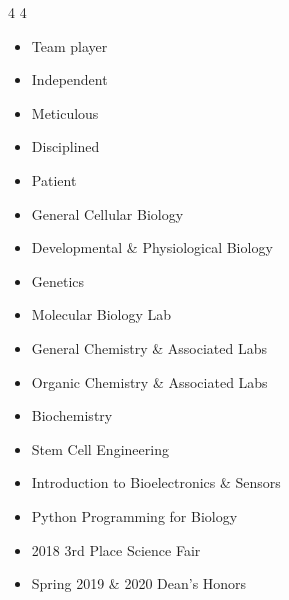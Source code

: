  {4}
 {4}

\begin{itemize}
    \item Team player
    \item Independent
    \item Meticulous
    \item Disciplined
    \item Patient
\end{itemize}

\begin{itemize}
    \item	General Cellular Biology
    \item   Developmental \& Physiological Biology
    \item   Genetics
    \item	Molecular Biology Lab
    \item   General Chemistry \& Associated Labs
    \item   Organic Chemistry \& Associated Labs
    \item   Biochemistry
    \item   Stem Cell Engineering
    \item   Introduction to Bioelectronics \& Sensors
    \item   Python Programming for Biology
\end{itemize}


\begin{itemize}
    \item 2018 3rd Place Science Fair
    \item Spring 2019 \& 2020 Dean’s Honors
\end{itemize}




